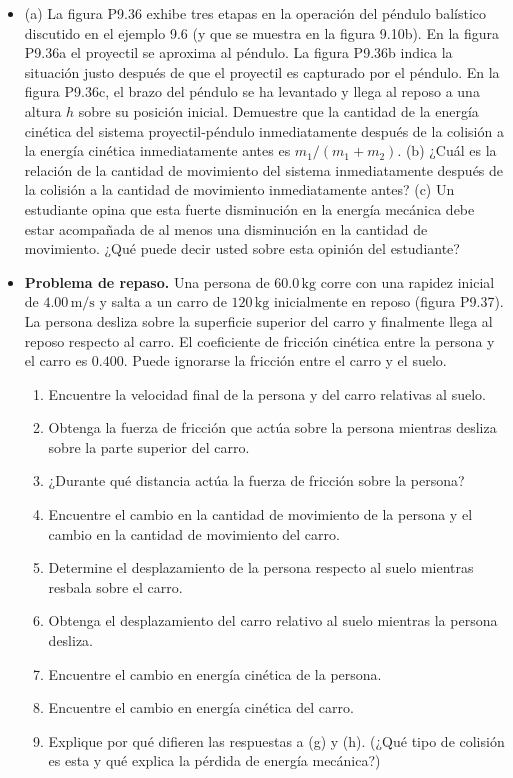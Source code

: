 \documentclass[11pt,a4paper]{article}
\begin{document}
\newpage

\begin{itemize}
    \item[\textbf{36.}] (a) La figura P9.36 exhibe tres etapas en la operación del péndulo balístico discutido en el ejemplo 9.6 (y que se muestra en la figura 9.10b). En la figura P9.36a el proyectil se aproxima al péndulo. La figura P9.36b indica la situación justo después de que el proyectil es capturado por el péndulo. En la figura P9.36c, el brazo del péndulo se ha levantado y llega al reposo a una altura \(h\) sobre su posición inicial. Demuestre que la cantidad de la energía cinética del sistema proyectil-péndulo inmediatamente después de la colisión a la energía cinética inmediatamente antes es \(m_1 / (m_1 + m_2)\). (b) ¿Cuál es la relación de la cantidad de movimiento del sistema inmediatamente después de la colisión a la cantidad de movimiento inmediatamente antes? (c) Un estudiante opina que esta fuerte disminución en la energía mecánica debe estar acompañada de al menos una disminución en la cantidad de movimiento. ¿Qué puede decir usted sobre esta opinión del estudiante?
    \vspace*{7cm}

    \item[\textbf{37.}] \textbf{Problema de repaso.} Una persona de \(60.0\,\text{kg}\) corre con una rapidez inicial de \(4.00\,\text{m/s}\) y salta a un carro de \(120\,\text{kg}\) inicialmente en reposo (figura P9.37). La persona desliza sobre la superficie superior del carro y finalmente llega al reposo respecto al carro. El coeficiente de fricción cinética entre la persona y el carro es \(0.400\). Puede ignorarse la fricción entre el carro y el suelo.
    \begin{enumerate}
        \item Encuentre la velocidad final de la persona y del carro relativas al suelo.
        \item Obtenga la fuerza de fricción que actúa sobre la persona mientras desliza sobre la parte superior del carro.
        \item ¿Durante qué distancia actúa la fuerza de fricción sobre la persona?
        \item Encuentre el cambio en la cantidad de movimiento de la persona y el cambio en la cantidad de movimiento del carro.
        \item Determine el desplazamiento de la persona respecto al suelo mientras resbala sobre el carro.
        \item Obtenga el desplazamiento del carro relativo al suelo mientras la persona desliza.
        \item Encuentre el cambio en energía cinética de la persona.
        \item Encuentre el cambio en energía cinética del carro.
        \item Explique por qué difieren las respuestas a (g) y (h). (¿Qué tipo de colisión es esta y qué explica la pérdida de energía mecánica?)
    \end{enumerate}
    \vspace*{9cm}
\end{itemize}
\end{document}
